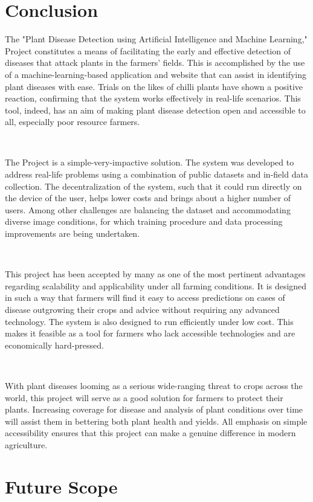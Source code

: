 \section{Conclusion}
The "Plant Disease Detection using Artificial Intelligence and Machine Learning," Project constitutes a means of facilitating the early and effective detection of diseases that attack plants in the farmers' fields. This is accomplished by the use of a machine-learning-based application and website that can assist in identifying plant diseases with ease. Trials on the likes of chilli plants have shown a positive reaction, confirming that the system works effectively in real-life scenarios. This tool, indeed, has an aim of making plant disease detection open and accessible to all, especially poor resource farmers.

\

The Project is a simple-very-impactive solution. The system was developed to address real-life problems using a combination of public datasets and in-field data collection. The decentralization of the system, such that it could run directly on the device of the user, helps lower costs and brings about a higher number of users. Among other challenges are balancing the dataset and accommodating diverse image conditions, for which training procedure and data processing improvements are being undertaken. 

\

This project has been accepted by many as one of the most pertinent advantages regarding scalability and applicability under all farming conditions. It is designed in such a way that farmers will find it easy to access predictions on cases of disease outgrowing their crops and advice without requiring any advanced technology. The system is also designed to run efficiently under low cost. This makes it feasible as a tool for farmers who lack accessible technologies and are economically hard-pressed. 

\

With plant diseases looming as a serious wide-ranging threat to crops across the world, this project will serve as a good solution for farmers to protect their plants. Increasing coverage for disease and analysis of plant conditions over time will assist them in bettering both plant health and yields. All emphasis on simple accessibility ensures that this project can make a genuine difference in modern agriculture. 


\section{Future Scope}

